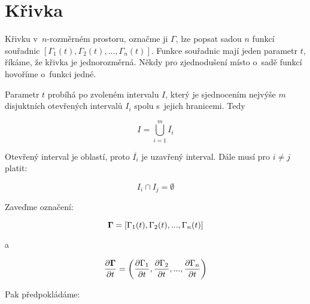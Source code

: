 \section{Křivka}

Křivku v~\(n\)-rozměrném prostoru, označme ji \(\Gamma\), lze popsat sadou \(n\) funkcí souřadnic \([\Gamma_1(t), \Gamma_2(t), ..., \Gamma_n(t)]\). Funkce souřadnic mají jeden parametr \(t\), říkáme, že křivka je jednorozměrná. Někdy pro zjednodušení místo o~sadě funkcí hovoříme o~funkci jedné.

Parametr \(t\) probíhá po zvoleném intervalu \(I\), který je sjednocením nejvýše \(m\) disjuktních otevřených intervalů \(I_i\) spolu s~jejich hranicemi. Tedy 

\begin{equation}
I = \bigcup_{i=1}^m \overline{I_i} 
\end{equation}

Otevřený interval je oblastí, proto \(\overline{I_i}\) je uzavřený interval. Dále musí pro \(i \neq j\) platit: 

\begin{equation}
I_i \cap I_j = \emptyset
\end{equation}

Zaveďme označení:

\begin{equation}
\boldsymbol{\Gamma} = [\Gamma_1(t), \Gamma_2(t), ..., \Gamma_n(t)]
\end{equation}

a

\begin{equation}
\frac{\partial \boldsymbol{\Gamma}}{\partial t} = \left(\frac{\partial \Gamma_1}{\partial t}, \frac{\partial \Gamma_2}{\partial t}, ..., \frac{\partial \Gamma_n}{\partial t} \right)
\end{equation}

Pak předpokládáme:

